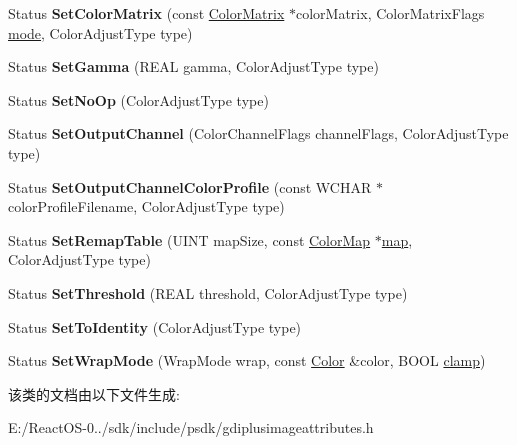 \begin{DoxyCompactItemize}
\item 
\mbox{\label{class_image_attributes_ad97d92832d2f1aaefeef7ebf893724f2}} 
Status {\bfseries Set\+Color\+Matrix} (const \hyperlink{struct_color_matrix}{Color\+Matrix} $\ast$color\+Matrix, Color\+Matrix\+Flags \hyperlink{interfacevoid}{mode}, Color\+Adjust\+Type type)
\item 
\mbox{\label{class_image_attributes_ab397e2c02f216fc950415a44fc220ccc}} 
Status {\bfseries Set\+Gamma} (R\+E\+AL gamma, Color\+Adjust\+Type type)
\item 
\mbox{\label{class_image_attributes_a8698e837f5968ee9065ab5967321143e}} 
Status {\bfseries Set\+No\+Op} (Color\+Adjust\+Type type)
\item 
\mbox{\label{class_image_attributes_af81aff8c3efbcd2d6df8729d214ff339}} 
Status {\bfseries Set\+Output\+Channel} (Color\+Channel\+Flags channel\+Flags, Color\+Adjust\+Type type)
\item 
\mbox{\label{class_image_attributes_a8f289b5d9bea8fb42ab47cbc87e7b460}} 
Status {\bfseries Set\+Output\+Channel\+Color\+Profile} (const W\+C\+H\+AR $\ast$color\+Profile\+Filename, Color\+Adjust\+Type type)
\item 
\mbox{\label{class_image_attributes_afae73a660dc4300f571ccb727a388cf0}} 
Status {\bfseries Set\+Remap\+Table} (U\+I\+NT map\+Size, const \hyperlink{struct_color_map}{Color\+Map} $\ast$\hyperlink{classmap}{map}, Color\+Adjust\+Type type)
\item 
\mbox{\label{class_image_attributes_ac71111dd7c9aa3ce6e76039f3aa83517}} 
Status {\bfseries Set\+Threshold} (R\+E\+AL threshold, Color\+Adjust\+Type type)
\item 
\mbox{\label{class_image_attributes_a4af5a0089f1e617a454b538cedc458d8}} 
Status {\bfseries Set\+To\+Identity} (Color\+Adjust\+Type type)
\item 
\mbox{\label{class_image_attributes_aec224465686c15e95f9622434a47c0c9}} 
Status {\bfseries Set\+Wrap\+Mode} (Wrap\+Mode wrap, const \hyperlink{struct_color}{Color} \&color, B\+O\+OL \hyperlink{interfacevoid}{clamp})
\end{DoxyCompactItemize}


该类的文档由以下文件生成\+:\begin{DoxyCompactItemize}
\item 
E\+:/\+React\+O\+S-\/0../sdk/include/psdk/gdiplusimageattributes.\+h\end{DoxyCompactItemize}

